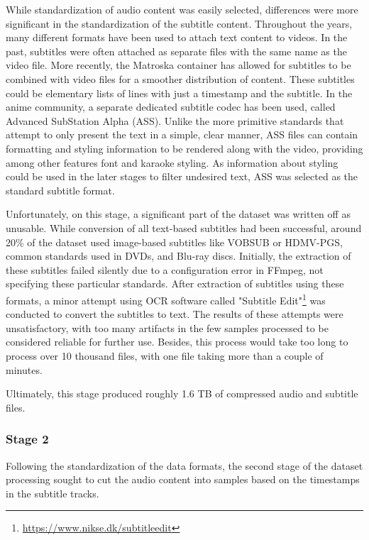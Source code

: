 While standardization of audio content was easily selected, differences were more significant in the standardization of the subtitle content.
Throughout the years, many different formats have been used to attach text content to videos.
In the past, subtitles were often attached as separate files with the same name as the video file.
More recently, the Matroska container has allowed for subtitles to be combined with video files for a smoother distribution of content.
These subtitles could be elementary lists of lines with just a timestamp and the subtitle.
In the anime community, a separate dedicated subtitle codec has been used, called Advanced SubStation Alpha\cite{wiki:advancedsub} (ASS).
Unlike the more primitive standards that attempt to only present the text in a simple, clear manner, ASS files can contain formatting and styling information to be rendered along with the video, providing among other features font and karaoke styling.
As information about styling could be used in the later stages to filter undesired text, ASS was selected as the standard subtitle format.

Unfortunately, on this stage, a significant part of the dataset was written off as unusable.
While conversion of all text-based subtitles had been successful, around 20\% of the dataset used image-based subtitles like VOBSUB or HDMV-PGS, common standards used in DVDs, and Blu-ray discs.
Initially, the extraction of these subtitles failed silently due to a configuration error in FFmpeg, not specifying these particular standards.
After extraction of subtitles using these formats, a minor attempt using OCR software called "Subtitle Edit"\footnote{\url{https://www.nikse.dk/subtitleedit}} was conducted to convert the subtitles to text.
The results of these attempts were unsatisfactory, with too many artifacts in the few samples processed to be considered reliable for further use.
Besides, this process would take too long to process over 10 thousand files, with one file taking more than a couple of minutes.

Ultimately, this stage produced roughly 1.6 TB of compressed audio and subtitle files.


\subsubsection{Stage 2}
Following the standardization of the data formats, the second stage of the dataset processing sought to cut the audio content into samples based on the timestamps in the subtitle tracks.

